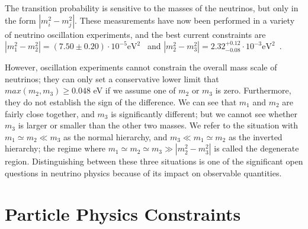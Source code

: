 The transition probability is sensitive to the masses of the neutrinos, but only in the form $\left| m_i^2 - m_j^2\right|$.  These measurements have now been performed in a variety of neutrino oscillation experiments, and the best current constraints are $\left| m_1^2 - m_2^2 \right| = (7.50 \pm 0.20) \cdot 10^{-5} \text{eV}^2$~\cite{PhysRevD.83.052002} and $\left| m_2^2 - m_3^2 \right| = 2.32^{+0.12}_{-0.08} \cdot 10^{-3} \text{eV}^2$~\cite{PhysRevLett.106.181801}.

However, oscillation experiments cannot constrain the overall mass scale of neutrinos; they can only set a conservative lower limit that $max(m_2, m_3) \ge 0.048$ eV if we assume one of $m_2$ or $m_3$ is zero.  Furthermore, they do not establish the sign of the difference.  We can see that $m_1$ and $m_2$ are fairly close together, and $m_3$ is significantly different; but we cannot see whether $m_3$ is larger or smaller than the other two masses.  We refer to the situation with $m_1 \simeq m_2 \ll m_3$ as the normal hierarchy, and $m_3 \ll m_1 \simeq m_2$ as the inverted hierarchy; the regime where $m_1 \simeq m_2 \simeq m_3 \gg \left| m_2^2 - m_3^2 \right|$ is called the degenerate region.  Distinguishing between these three situations is one of the significant open questions in neutrino physics because of its impact on observable quantities.

\section{Particle Physics Constraints}\label{sec:ParticlePhysicsConstraints}

